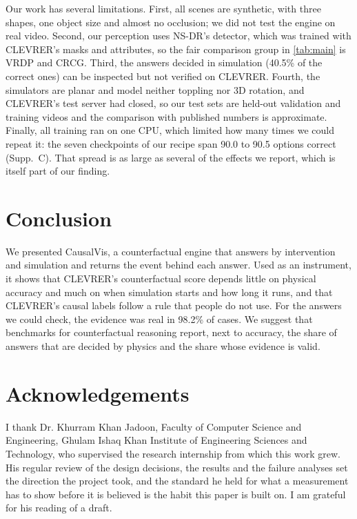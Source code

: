 \documentclass[10pt,twocolumn,letterpaper]{article}
\newif\ifanon
\newcommand{\sys}{CausalVis}
\begin{document}
Our work has several limitations.
First, all scenes are synthetic, with three shapes, one object size and almost no occlusion; we did not test the engine on real video.
Second, our perception uses NS-DR's detector, which was trained with CLEVRER's masks and attributes, so the fair comparison group in \cref{tab:main} is VRDP and CRCG.
Third, the answers decided in simulation (40.5\% of the correct ones) can be inspected but not verified on CLEVRER.
Fourth, the simulators are planar and model neither toppling nor 3D rotation, and CLEVRER's test server had closed, so our test sets are held-out validation and training videos and the comparison with published numbers is approximate.
Finally, all training ran on one CPU, which limited how many times we could repeat it: the seven checkpoints of our recipe span 90.0 to 90.5 options correct (Supp.~C).
That spread is as large as several of the effects we report, which is itself part of our finding.

\section{Conclusion}
\label{sec:conclusion}

We presented \sys{}, a counterfactual engine that answers by intervention and simulation and returns the event behind each answer.
Used as an instrument, it shows that CLEVRER's counterfactual score depends little on physical accuracy and much on when simulation starts and how long it runs, and that CLEVRER's causal labels follow a rule that people do not use.
For the answers we could check, the evidence was real in 98.2\% of cases.
We suggest that benchmarks for counterfactual reasoning report, next to accuracy, the share of answers that are decided by physics and the share whose evidence is valid.

\ifanon\else
\section*{Acknowledgements}
I thank Dr. Khurram Khan Jadoon, Faculty of Computer Science and Engineering, Ghulam Ishaq Khan Institute of Engineering Sciences and Technology, who supervised the research internship from which this work grew.
His regular review of the design decisions, the results and the failure analyses set the direction the project took, and the standard he held for what a measurement has to show before it is believed is the habit this paper is built on.
I am grateful for his reading of a draft.
\end{document}
